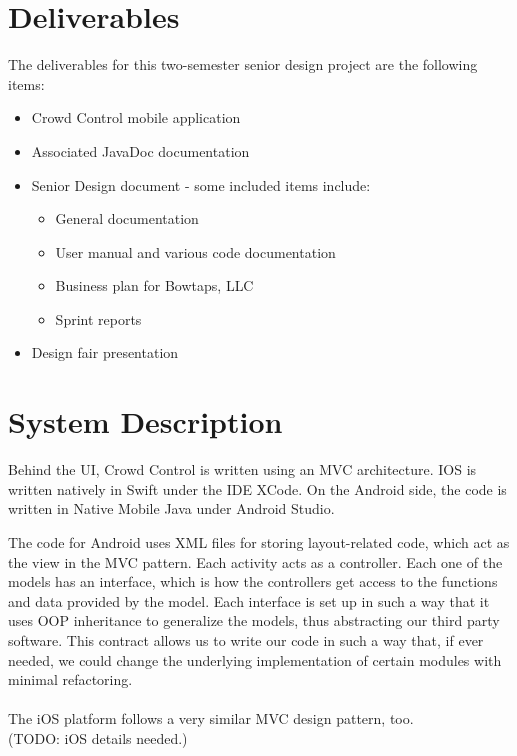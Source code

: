 \section{Deliverables}

The deliverables for this two-semester senior design project are the following items:
	\begin{itemize}
	  \item Crowd Control mobile application
	  \item Associated JavaDoc documentation
	  \item Senior Design document - some included items include:
	  	\begin{itemize}
		  \item General documentation
		  \item User manual and various code documentation
		  \item Business plan for Bowtaps, LLC
		  \item Sprint reports
		\end{itemize}
	  \item Design fair presentation
	\end{itemize}


\section{System Description}
Behind the UI, Crowd Control is written using an MVC architecture. IOS is written natively in Swift under the IDE XCode. On the Android side, the code is written in Native Mobile Java under Android Studio.

The code for Android uses XML files for storing layout-related code, which act as the view in the MVC pattern. Each activity acts as a controller. Each one of the models has an interface, which is how the controllers get access to the functions and data provided by the model. Each interface is set up in such a way that it uses OOP inheritance to generalize the models, thus abstracting our third party software. This contract allows us to write our code in such a way that, if ever needed, we could change the underlying implementation of certain modules with minimal refactoring.\\\\
The iOS platform follows a very similar MVC design pattern, too.\\
(TODO: iOS details needed.)

